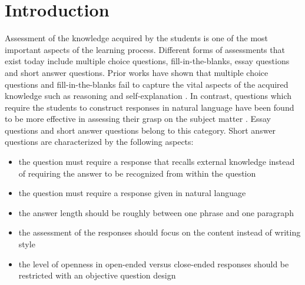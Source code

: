 
\chapter{Introduction}

Assessment of the knowledge acquired by the students is one of the most important aspects of the learning process. Different forms of assessments that exist today include multiple choice questions, fill-in-the-blanks, essay questions and short answer questions. Prior works have shown that multiple choice questions and fill-in-the-blanks fail to capture the vital aspects of the acquired knowledge such as reasoning and self-explanation \cite{Wang2008}. In contrast, questions which require the students to construct responses in natural language have been found to be more effective in assessing their grasp on the subject matter \cite{Roy2016a}. Essay questions and short answer questions belong to this category. Short answer questions are characterized by the following aspects\cite{Burrows2015}:

\begin{itemize}
	
	\item the question must require a response that recalls external knowledge instead of requiring the answer to be recognized from within the question
	
	\item the question must require a response given in natural language
	
	\item the answer length should be roughly between one phrase and one paragraph
	
	\item the assessment of the responses should focus on the content instead of writing style
	
	\item the level of openness in open-ended versus close-ended responses should be restricted with an objective question design 
	
\end{itemize}

